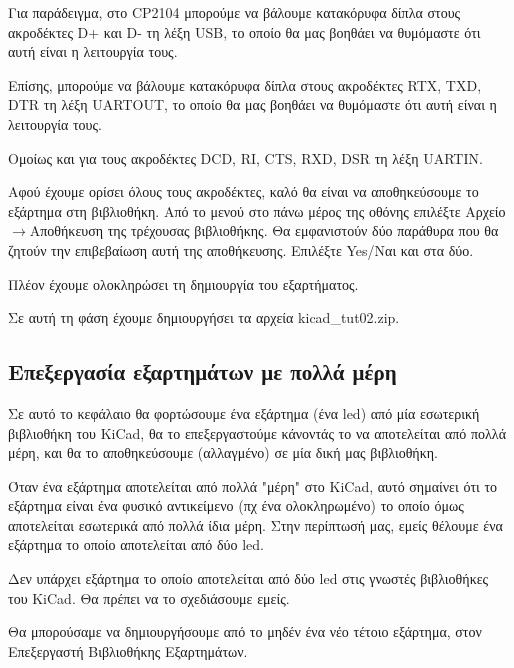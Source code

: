 \documentclass[a4paper]{article}
\begin{document}
\begin{figure}
  \begin{center}
    \label{fig:kicad-main}
  \end{center}
\end{figure}

Για παράδειγμα, στο CP2104 μπορούμε να βάλουμε κατακόρυφα δίπλα στους ακροδέκτες D+ και D- τη λέξη USB, το οποίο θα μας βοηθάει να θυμόμαστε ότι αυτή είναι η λειτουργία τους.

Επίσης, μπορούμε να βάλουμε κατακόρυφα δίπλα στους ακροδέκτες RTX, TXD, DTR τη λέξη UARTOUT, το οποίο θα μας βοηθάει να θυμόμαστε ότι αυτή είναι η λειτουργία τους.

Ομοίως και για τους ακροδέκτες DCD, RI, CTS, RXD, DSR τη λέξη UARTΙΝ.

Αφού έχουμε ορίσει όλους τους ακροδέκτες, καλό θα είναι να αποθηκεύσουμε το εξάρτημα στη βιβλιοθήκη. Από το μενού στο πάνω μέρος της οθόνης επιλέξτε Αρχείο$\rightarrow$Αποθήκευση της τρέχουσας βιβλιοθήκης. Θα εμφανιστούν δύο παράθυρα που θα ζητούν την επιβεβαίωση αυτή της αποθήκευσης. Επιλέξτε Yes/Ναι και στα δύο.

Πλέον έχουμε ολοκληρώσει τη δημιουργία του εξαρτήματος.

Σε αυτή τη φάση έχουμε δημιουργήσει τα αρχεία kicad\_tut02.zip.

\subsection{Επεξεργασία εξαρτημάτων με πολλά μέρη}

Σε αυτό το κεφάλαιο θα φορτώσουμε ένα εξάρτημα (ένα led) από μία εσωτερική βιβλιοθήκη του KiCad, θα το επεξεργαστούμε κάνοντάς το να αποτελείται από πολλά μέρη, και θα το αποθηκεύσουμε (αλλαγμένο) σε μία δική μας βιβλιοθήκη.

Όταν ένα εξάρτημα αποτελείται από πολλά "μέρη" στο KiCad, αυτό σημαίνει ότι το εξάρτημα είναι ένα φυσικό αντικείμενο (πχ ένα ολοκληρωμένο) το οποίο όμως αποτελείται εσωτερικά από πολλά ίδια μέρη. Στην περίπτωσή μας, εμείς θέλουμε ένα εξάρτημα το οποίο αποτελείται από δύο led.

Δεν υπάρχει εξάρτημα το οποίο αποτελείται από δύο led στις γνωστές βιβλιοθήκες του KiCad. Θα πρέπει να το σχεδιάσουμε εμείς.

Θα μπορούσαμε να δημιουργήσουμε από το μηδέν ένα νέο τέτοιο εξάρτημα, στον Επεξεργαστή Βιβλιοθήκης Εξαρτημάτων. 
\end{document}
